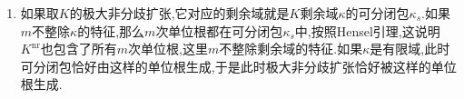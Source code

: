 \begin{enumerate}
\begin{proof}
    	设$A'$和$A''$是$A$在$K'$和$K''$的整闭包,那么$K$代数同态做限制就得到典范双射$\mathrm{Hom}_K(K',K'')\cong\mathrm{Hom}_A(A',A'')$.我们来证明$A$代数同态诱导在剩余域上得到的同态$\theta:\mathrm{Hom}_A(A',A'')\to\mathrm{Hom}_{\kappa}(\kappa',\kappa'')$是双射.
    	
    	\qquad
    	
    	设$[K':K]=n$,因为$A$是DVR,所以存在$x\in A'$使得$\{1,x,\cdots,x^{n-1}\}$是$A'$在$A$上的一组基.设$x$的特征多项式为$f$,那么$\overline{f}\in\kappa[X]$是$\overline{x}$在$\kappa$上的特征多项式.所以$\mathrm{Hom}_A(A',A'')$中的元一一对应于满足$f(a'')=0$的元$a''\in A''$.类似的$\mathrm{Hom}_{\kappa}(\kappa',\kappa'')$中的元一一对应于满足$\overline{f}(\xi'')=0$的元$\xi''\in\kappa''$.所以问题归结为$\overline{f}$在$\kappa''$中的根唯一的提升为$f$在$A''$中的根.但是这是因为$K$是完备离散赋值域,所以有Hensel引理,并且$\overline{f}$是可分多项式.
    \end{proof}
    \item 如果取$K$的极大非分歧扩张,它对应的剩余域就是$K$剩余域$\kappa$的可分闭包$\kappa_s$.如果$m$不整除$\kappa$的特征,那么$m$次单位根都在可分闭包$\kappa_s$中,按照Hensel引理,这说明$K^{\mathrm{nr}}$也包含了所有$m$次单位根,这里$m$不整除剩余域的特征.如果$\kappa$是有限域,此时可分闭包恰好由这样的单位根生成,于是此时极大非分歧扩张恰好被这样的单位根生成.
\end{enumerate}

